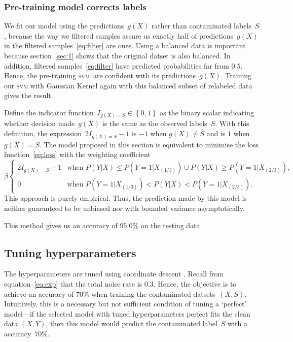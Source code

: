 \documentclass[12pt]{article} %
\newcommand{\svm}{\textsc{svm}}
\begin{document}
\subsubsection{Pre-training model corrects labels}
We fit our model using the predictions~$g(X)$ rather than contaminated labels~$S$, because the way we filtered samples  assure us exactly half of predictions~$g(X)$ in the filtered samples~\eqref{eq:filter}  are ones.
Using a balanced data is important because section~\ref{sec:1} shows that the original datset is also balanced. In addition, filtered samples~\eqref{eq:filter} have  predicted probabilities far from $0.5$. Hence, the pre-training \svm\ are confident with its predictions~$g(X)$.
Training our \textsc{svm} with Gaussian Kernel again with this balanced subset of relabeled data gives the result.

Define the indicator function~$I_{g(X)=S} \in \left\{0,1\right\}$ as the binary scalar indicating whether decision made~$g(X)$ is the same as the observed labels~$S$. With this definition, the expression~$2I_{g(X)=S}-1$ is $-1$ when $g(X)\neq S$ and is $1$ when $g(X)=S$.  The model proposed in this section is equivalent to minimise the loss function~\eqref{eq:loss} with the weighting coefficient
\begin{equation*}
\beta\begin{cases}
2I_{g(X)=S}-1 & \text{when }P({Y}|X)\leq P(Y=1|X_{(1/3)}) \cup P({Y}|X)\geq P(Y=1|X_{(2/3)}),\\
0 & \text{when }P(Y=1|X_{(1/3)})<P({Y}|X)<P(Y=1|X_{(2/3)}).
\end{cases}
\end{equation*}
This approach is purely empirical. Thus, the prediction made by this model is neither guaranteed to be unbiased nor with bounded variance asymptotically.

This method gives us an accuracy of $95.0\%$ on the testing data.


\subsection{Tuning hyperparameters}
The hyperparameters are tuned using coordinate descent \citep{hastie01statisticallearning}. Recall from equation~\eqref{eq:exp} that the total noise rate is 0.3. Hence,  the objective is to achieve an accuracy of $70\%$ when training the contaminated datsets~$(X,S)$. Intuitively, this is a necessary but not sufficient condition of tuning a `perfect' model---if the selected model with tuned hyperparameters perfect fits the clean data $(X,Y)$, then this model would predict the contaminated label~$S$ with a accuracy~$70\%$.
\end{document}
